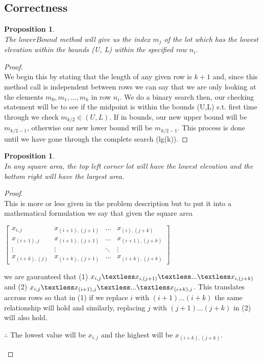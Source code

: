 \documentclass[12pt]{article}
\newtheorem{proposition}[theorem]{Proposition}
\begin{document}

\subsection{Correctness}
\begin{proposition}
~ \\ \indent The $lowerBound$ method will give us the index $m_j$ of the lot which has the lowest elevation within the bounds (U, L)
within the specified row $n_i$.
\end{proposition}

\begin{proof}
~ \\ \indent We begin this by stating that the length of any given row is $k+1$ and, since this method call is independent between
rows we can say that we are only looking at the elements $m_0, m_1, ..., m_k$ in row $n_i$. We do a binary search then,
our checking statement will be to see if the midpoint is within the bounds (U,L) s.t. first time through we check
$m_{k/2} \in (U,L)$. If in bounds, our new upper bound will be $m_{k/2-1}$, otherwise our new lower bound will be
$m_{k/2-1}$. This process is done until we have gone through the complete search (lg(k)).
\end{proof}

\begin{proposition}
~ \\ \indent In any square area, the top left corner lot will have the lowest elevation and the bottom right will have
the largest area.
\end{proposition}

\begin{proof}
~ \\ \indent This is more or less given in the problem description but to put it into a mathematical formulation we say that given
the square area
\begin{center}$
\begin{bmatrix}
    x_{i,j}          & x_{(i+1),(j+1)} & \dots  & x_{(i),(j+k)}     \\
    x_{(i+1),j}      & x_{(i+1),(j+1)} & \dots  & x_{(i+1),(j+k)}   \\
    \vdots           & \vdots          & \ddots & \vdots            \\
    x_{(i+k),(j)}    & x_{(i+k),(j+1)} & \dots  & x_{(i+k),(j+k)}
\end{bmatrix}
$\end{center}
we are gauranteed that (1) $x_{i,j} \textless x_{i,(j+1)} \textless ... \textless x_{i,(j+k)}$
and (2) $x_{i,j} \textless x_{(i+1),j} \textless ... \textless x_{(i+k),j}$.  This translates
accross rows so that in (1) if we replace $i$ with $(i+1)...(i+k)$ the same relationship will hold
and similarly, replacing $j$ with $(j+1)...(j+k)$ in (2) will also hold.
\begin{center}$\therefore$ The lowest value will be $x_{i,j}$ and the highest will be $x_{(i+k),(j+k)}$.\end{center}
\end{proof}
\end{document}
